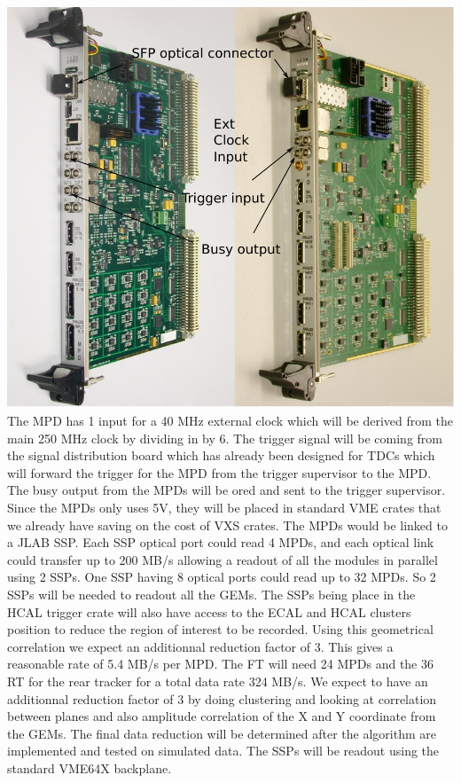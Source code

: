 \documentclass{article}
\begin{document}
\includegraphics[scale=0.55]{figs/MPD4_UserManual.pdf}\\

The MPD has 1 input for a 40 MHz external clock which will be derived from the main 250 MHz clock by dividing in by 6. The trigger signal will be coming from the signal distribution board which has already been designed for TDCs which will forward the trigger for the MPD from the trigger supervisor to the MPD. The busy output from the MPDs will be ored and sent to the trigger supervisor. Since the MPDs only uses 5V, they will be placed in standard VME crates that we already have saving on the cost of VXS crates.
The MPDs would be linked to a JLAB SSP. Each SSP optical port could read 4 MPDs, and each optical link could transfer up to 200 MB/s allowing a readout of all the modules in parallel using 2 SSPs. One SSP having 8 optical ports could read up to 32 MPDs. So 2 SSPs will be needed to readout all the GEMs. The SSPs being place in the HCAL trigger crate will also have access to the ECAL and HCAL clusters position to reduce the region of interest to be recorded. Using this geometrical correlation we expect an additionnal reduction factor of 3. This gives a reasonable rate of 5.4 MB/s per MPD. The FT will need 24 MPDs and the 36 RT for the rear tracker for a total data rate 324 MB/s. We expect to have an additionnal reduction factor of 3 by doing clustering and looking at correlation between planes and also amplitude correlation of the X and Y coordinate from the GEMs. The final data reduction will be determined after the algorithm are implemented and tested on simulated data. The SSPs will be readout using the standard VME64X backplane.
\end{document}
